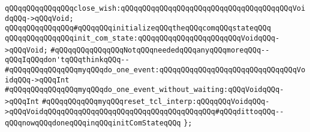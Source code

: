 \verb|qQQqqQQqqQQqqQQqclose_wish:qQQqqQQqqQQqqQQqqQQqqQQqqQQqqQQqqQQqqQQqVoidqQQq->qQQqVoid;|\newline
\newline
\verb|qQQqqQQqqQQqqQQq#qQQqqQQqinitializeqQQqtheqQQqcomqQQqstateqQQq|\newline
\verb|qQQqqQQqqQQqqQQqinit_com_state:qQQqqQQqqQQqqQQqqQQqqQQqVoidqQQq->qQQqVoid;|\newline
\newline
\verb|#qQQqqQQqqQQqqQQqNotqQQqneededqQQqanyqQQqmoreqQQq--qQQqIqQQqdon'tqQQqthinkqQQq--|\newline
\verb|#qQQqqQQqqQQqqQQqmyqQQqdo_one_event:qQQqqQQqqQQqqQQqqQQqqQQqqQQqqQQqVoidqQQq->qQQqInt|\newline
\verb|#qQQqqQQqqQQqqQQqmyqQQqdo_one_event_without_waiting:qQQqVoidqQQq->qQQqInt|\newline
\newline
\newline
\verb|#qQQqqQQqqQQqmyqQQqreset_tcl_interp:qQQqqQQqVoidqQQq->qQQqVoidqQQqqQQqqQQqqQQqqQQqqQQqqQQqqQQqqQQqqQQq#qQQqdittoqQQq--qQQqnowqQQqdoneqQQqinqQQqinitComStateqQQq|\newline
\newline
\verb|};|\newline
\newline

